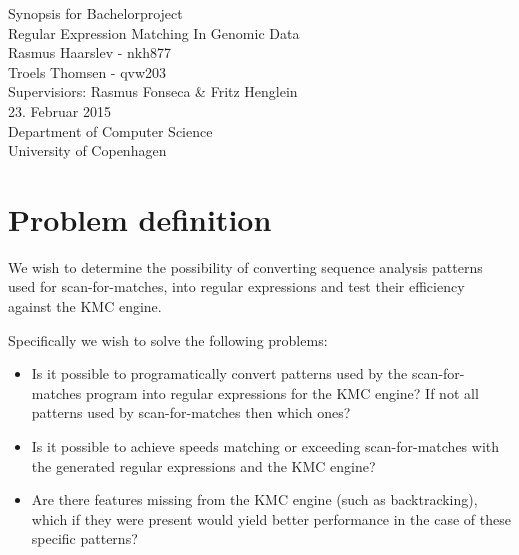 \documentclass[12pt]{article}
\begin{document}
\begin{titlepage}
    \vspace*{\fill}
    \begin{center}
      {\Huge Synopsis for Bachelorproject}\\[0.7cm]
      {\Large Regular Expression Matching In Genomic Data}\\[0.4cm]
      {\large Rasmus Haarslev - nkh877}\\
      {\large Troels Thomsen - qvw203}\\[0.4cm]
      {Supervisiors: Rasmus Fonseca \& Fritz Henglein}\\
      {\small 23. Februar 2015}\\[0.3cm] 
      {\small Department of Computer Science}\\
      {\small University of Copenhagen}
    \end{center}
    \vspace*{\fill}
\end{titlepage}	

\clearpage

\thispagestyle{empty}

\newpage

\section{Problem definition}

We wish to determine the possibility of converting sequence analysis patterns used for scan-for-matches\cite{scan-for-matches}, into regular expressions\cite{crash-course-regex} and test their efficiency against the KMC\cite{kmc-website} engine.

Specifically we wish to solve the following problems:

\begin{itemize}
	\item Is it possible to programatically convert patterns used by the scan-for-matches program into regular expressions for the KMC engine? If not all patterns used by scan-for-matches then which ones?
	\item Is it possible to achieve speeds matching or exceeding scan-for-matches with the generated regular expressions and the KMC engine?
	\item Are there features missing from the KMC engine (such as backtracking), which if they were present would yield better performance in the case of these specific patterns?
\end{itemize}
\end{document}
